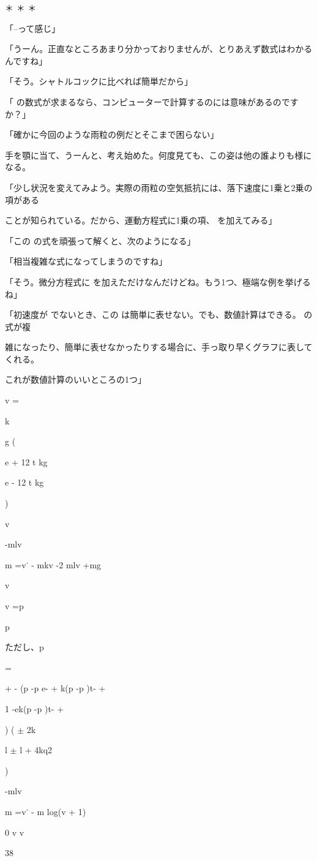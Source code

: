 ＊ ＊ ＊\par
「--って感じ」\par
「うーん。正直なところあまり分かっておりませんが、とりあえず数式はわかるんですね」\par
「そう。シャトルコックに⽐べれば簡単だから」\par
「 の数式が求まるなら、コンピューターで計算するのには意味があるのですか？」\par
「確かに今回のような⾬粒の例だとそこまで困らない」\par
⼿を顎に当て、うーんと、考え始めた。何度⾒ても、この姿は他の誰よりも様になる。\par
「少し状況を変えてみよう。実際の⾬粒の空気抵抗には、落下速度に1乗と2乗の項がある\par
ことが知られている。だから、運動⽅程式に1乗の項、 を加えてみる」\par
「この の式を頑張って解くと、次のようになる」\par
「相当複雑な式になってしまうのですね」\par
「そう。微分⽅程式に を加えただけなんだけどね。もう1つ、極端な例を挙げるね」\par
「初速度が でないとき、この は簡単に表せない。でも、数値計算はできる。 の式が複\par
雑になったり、簡単に表せなかったりする場合に、⼿っ取り早くグラフに表してくれる。\par
これが数値計算のいいところの1つ」\par
v =\par
k\par
g (\par
e + 12  t kg\par
e - 12  t kg\par
)\par
v\par
-mlv\par
m =v˙ - mkv -2 mlv +mg\par
v\par
v =p\par
p\par
ただし、p\par
=\par
+ - (p  -p  e- + k(p  -p  )t- +\par
1 -ek(p  -p  )t- +\par
) ( $\pm$ 2k\par
l $\pm$  l + 4kq2\par
)\par
-mlv\par
m =v˙ - m log(v + 1)\par
0 v v\par
38\par

